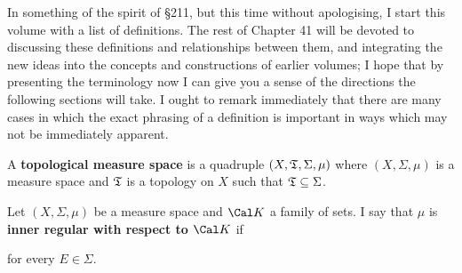 
\def\chaptername{Topologies and measures I}
\def\sectionname{Definitions}


In something of the spirit of \S211, but this time without apologising,
I start this volume with a list of definitions.   The rest of Chapter 41
will be devoted to discussing these definitions and relationships
between them, and integrating the new ideas into the concepts and
constructions
of earlier volumes;  I hope that by presenting the terminology now
I can give you a sense of the directions the following sections will
take.   I ought to remark immediately that there are many cases in which
the exact phrasing of a definition is important in ways which may
not be immediately apparent.

 A {\bf topological measure space} is a
quadruple $(X,\frak T,\Sigma,\mu)$ where $(X,\Sigma,\mu)$ is a measure
space and $\frak T$ is a topology on $X$ such that
$\frak T\subseteq\Sigma$.

 Let $(X,\Sigma,\mu)$ be a measure space and
$\Cal K$ a family of sets.   I say that $\mu$ is {\bf inner
regular with respect to $\Cal K$} if


\noindent for every $E\in\Sigma$.   


